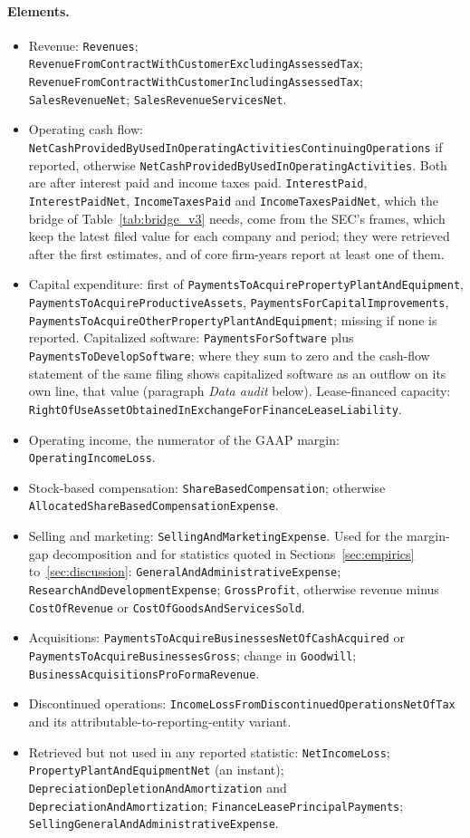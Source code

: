 \paragraph{Elements.}
{\raggedright\small
\begin{itemize}
\item Revenue: \texttt{Revenues}; \texttt{RevenueFromContractWithCustomerExcludingAssessedTax}; \texttt{RevenueFromContractWithCustomerIncludingAssessedTax}; \texttt{SalesRevenueNet}; \texttt{SalesRevenueServicesNet}.
\item Operating cash flow: \texttt{NetCashProvidedByUsedInOperatingActivitiesContinuingOperations} if reported, otherwise \texttt{NetCashProvidedByUsedInOperatingActivities}. Both are after interest paid and income taxes paid. \texttt{InterestPaid}, \texttt{InterestPaidNet}, \texttt{IncomeTaxesPaid} and \texttt{IncomeTaxesPaidNet}, which the bridge of Table~\ref{tab:bridge_v3} needs, come from the SEC's frames, which keep the latest filed value for each company and period; they were retrieved after the first estimates, and \BridgeCov{} of \BridgeCovOf{} core firm-years report at least one of them.
\item Capital expenditure: first of \texttt{PaymentsToAcquirePropertyPlantAndEquipment}, \texttt{PaymentsToAcquireProductiveAssets}, \texttt{PaymentsForCapitalImprovements}, \texttt{PaymentsToAcquireOtherPropertyPlantAndEquipment}; missing if none is reported. Capitalized software: \texttt{PaymentsForSoftware} plus \texttt{PaymentsToDevelopSoftware}; where they sum to zero and the cash-flow statement of the same filing shows capitalized software as an outflow on its own line, that value (paragraph \emph{Data audit} below). Lease-financed capacity: \texttt{RightOfUseAssetObtainedInExchangeForFinanceLeaseLiability}.
\item Operating income, the numerator of the GAAP margin: \texttt{OperatingIncomeLoss}.
\item Stock-based compensation: \texttt{ShareBasedCompensation}; otherwise \texttt{AllocatedShareBasedCompensationExpense}.
\item Selling and marketing: \texttt{SellingAndMarketingExpense}. Used for the margin-gap decomposition and for statistics quoted in Sections~\ref{sec:empirics} to~\ref{sec:discussion}: \texttt{GeneralAndAdministrativeExpense}; \texttt{ResearchAndDevelopmentExpense}; \texttt{GrossProfit}, otherwise revenue minus \texttt{CostOfRevenue} or \texttt{CostOfGoodsAndServicesSold}.
\item Acquisitions: \texttt{PaymentsToAcquireBusinessesNetOfCashAcquired} or \texttt{PaymentsToAcquireBusinessesGross}; change in \texttt{Goodwill}; \texttt{BusinessAcquisitionsProFormaRevenue}.
\item Discontinued operations: \texttt{IncomeLossFromDiscontinuedOperationsNetOfTax} and its attributable-to-reporting-entity variant.
\item Retrieved but not used in any reported statistic: \texttt{NetIncomeLoss}; \texttt{PropertyPlantAndEquipmentNet} (an instant); \texttt{DepreciationDepletionAndAmortization} and \texttt{DepreciationAndAmortization}; \texttt{FinanceLeasePrincipalPayments}; \texttt{SellingGeneralAndAdministrativeExpense}.
\end{itemize}
}

